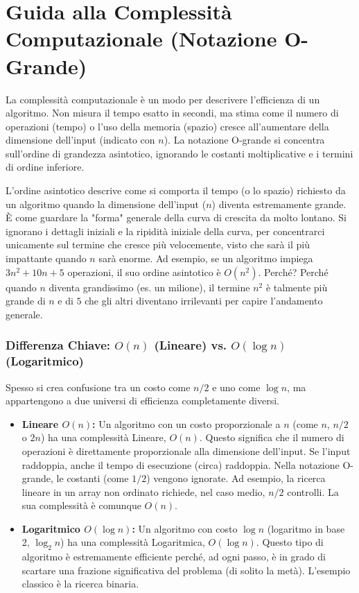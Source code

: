 \part{Guida alla Complessità Computazionale (Notazione O-Grande)}

La complessità computazionale è un modo per descrivere l'efficienza di un algoritmo.
Non misura il tempo esatto in secondi, ma stima come il numero di operazioni (tempo) o l'uso della memoria (spazio) cresce all'aumentare della dimensione dell'input (indicato con $n$).
La notazione O-grande si concentra sull'ordine di grandezza asintotico, ignorando le costanti moltiplicative e i termini di ordine inferiore.

\begin{definition}
L'ordine asintotico descrive come si comporta il tempo (o lo spazio) richiesto da un algoritmo quando la dimensione dell'input ($n$) diventa estremamente grande. È come guardare la "forma" generale della curva di crescita da molto lontano.
Si ignorano i dettagli iniziali e la ripidità iniziale della curva, per concentrarci unicamente sul termine che cresce più velocemente, visto che sarà il più impattante quando $n$ sarà enorme.
Ad esempio, se un algoritmo impiega $3n^2 + 10n + 5$ operazioni, il suo ordine asintotico è $O(n^2)$.
Perché? Perché quando $n$ diventa grandissimo (es. un milione), il termine $n^2$ è talmente più grande di $n$ e di $5$ che gli altri diventano irrilevanti per capire l'andamento generale.
\end{definition}

\section{Differenza Chiave: $O(n)$ (Lineare) vs. $O(\log n)$ (Logaritmico)}
Spesso si crea confusione tra un costo come $n/2$ e uno come $\log n$, ma appartengono a due universi di efficienza completamente diversi.

\begin{itemize}
    \item \textbf{Lineare $O(n)$:} Un algoritmo con un costo proporzionale a $n$ (come $n$, $n/2$ o $2n$) ha una complessità Lineare, $O(n)$. Questo significa che il numero di operazioni è direttamente proporzionale alla dimensione dell'input. Se l'input raddoppia, anche il tempo di esecuzione (circa) raddoppia. Nella notazione O-grande, le costanti (come $1/2$) vengono ignorate. Ad esempio, la ricerca lineare in un array non ordinato richiede, nel caso medio, $n/2$ controlli. La sua complessità è comunque $O(n)$.
    
    \item \textbf{Logaritmico $O(\log n)$:} Un algoritmo con costo $\log n$ (logaritmo in base 2, $\log_2 n$) ha una complessità Logaritmica, $O(\log n)$. Questo tipo di algoritmo è estremamente efficiente perché, ad ogni passo, è in grado di scartare una frazione significativa del problema (di solito la metà). L'esempio classico è la ricerca binaria.
\end{itemize}

